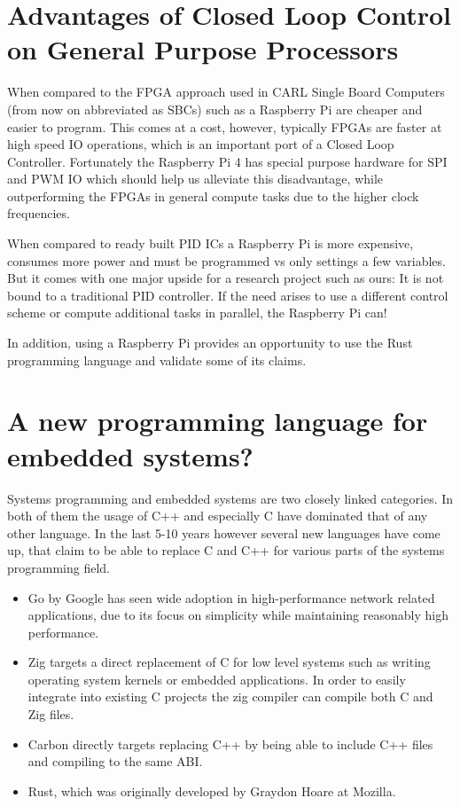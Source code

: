 \section{Advantages of Closed Loop Control on General Purpose Processors}
\label{sec:introduction:gpp}

When compared to the FPGA approach used in CARL Single Board Computers (from now on abbreviated as SBCs) such as a Raspberry Pi are cheaper and easier to program.
This comes at a cost, however, typically FPGAs are faster at high speed IO operations, which is an important port of a Closed Loop Controller.
Fortunately the Raspberry Pi 4 has special purpose hardware for SPI and PWM IO which should help us alleviate this disadvantage,
while outperforming the FPGAs in general compute tasks due to the higher clock frequencies.

When compared to ready built PID ICs a Raspberry Pi is more expensive, consumes more power and must be programmed vs only settings a few variables.
But it comes with one major upside for a research project such as ours:
It is not bound to a traditional PID controller. If the need arises to use a different control scheme or compute additional tasks in parallel, the Raspberry Pi can!

In addition, using a Raspberry Pi provides an opportunity to use the Rust programming language and validate some of its claims.

\section{A new programming language for embedded systems?}
\label{sec:introduction:rust}

Systems programming and embedded systems are two closely linked categories.
In both of them the usage of C++ and especially C have dominated that of any other language.
In the last 5-10 years however several new languages have come up,
that claim to be able to replace C and C++ for various parts of the systems programming field.
\begin{itemize}
    \item Go by Google has seen wide adoption in high-performance network related applications, due to its focus on simplicity while maintaining reasonably high performance.\cite{Go}
    \item Zig targets a direct replacement of C for low level systems such as writing operating system kernels or embedded applications. In order to easily integrate into existing C projects the zig compiler can compile both C and Zig files.\cite{Zig}
    \item Carbon directly targets replacing C++ by being able to include C++ files and compiling to the same ABI.\cite{Carbon}
    \item Rust, which was originally developed by Graydon Hoare at Mozilla.\cite{TheRustProgrammingLanguage}
\end{itemize}

